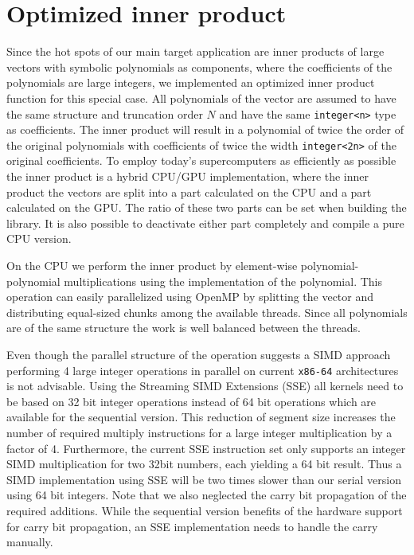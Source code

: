 \documentclass[oribibl,a4paper]{llncs2e/llncs}
\begin{document}
\section{Optimized inner product}
Since the hot spots of our main target application are inner products of large vectors with symbolic polynomials as components, where the coefficients of the polynomials are large integers, we implemented an optimized inner product function for this special case.
All polynomials of the vector are assumed to have the same structure and truncation order $N$ and have the same \verb|integer<n>| type as coefficients.
The inner product will result in a polynomial of twice the order of the original polynomials with coefficients of twice the width \verb|integer<2n>| of the original coefficients.
To employ today's supercomputers as efficiently as possible the inner product is a hybrid CPU/GPU implementation,
where the inner product the vectors are split into a part calculated on the CPU and a part calculated on the GPU.
The ratio of these two parts can be set when building the library.
It is also possible to deactivate either part completely and compile a pure CPU version.

On the CPU we perform the inner product by element-wise polynomial-polynomial multiplications using the implementation of the polynomial.
This operation can easily parallelized using OpenMP by splitting the vector and distributing equal-sized chunks among the available threads.
Since all polynomials are of the same structure the work is well balanced between the threads.

Even though the parallel structure of the operation suggests a SIMD approach performing 4 large integer operations in parallel on current \verb|x86-64| architectures is not advisable.
Using the Streaming SIMD Extensions (SSE) all kernels need to be based on 32 bit integer operations instead of 64 bit operations which are available for the sequential version.
This reduction of segment size increases the number of required multiply instructions for a large integer multiplication by a factor of 4.
Furthermore, the current SSE instruction set only supports an integer SIMD multiplication for two 32bit numbers, each yielding a 64 bit result.
Thus a SIMD implementation using SSE will be two times slower than our serial version using 64 bit integers.
Note that we also neglected the carry bit propagation of the required additions.
While the sequential version benefits of the hardware support for carry bit propagation, an SSE implementation needs to handle the carry manually.
\end{document}
